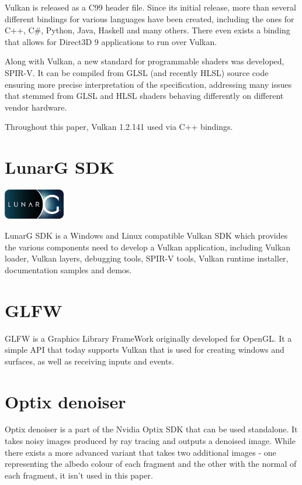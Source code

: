 \documentclass[times, utf8, zavrsni, numeric]{fer}
\begin{document}
Vulkan is released as a C99 header file. Since its initial release, more than several different bindings for various languages have been created, including the ones for C++, C\#, Python, Java, Haskell and many others. There even exists a binding that allows for Direct3D 9 applications to run over Vulkan.

Along with Vulkan, a new standard for programmable shaders was developed, SPIR-V. It can be compiled from GLSL (and recently HLSL) source code ensuring more precise interpretation of the specification, addressing many issues that stemmed from GLSL and HLSL shaders behaving differently on different vendor hardware.

Throughout this paper, Vulkan 1.2.141 used via C++ bindings.

\section{LunarG SDK}

\begin{center}
\includegraphics[width=0.2\textwidth]{lunarg_logo.png}
\end{center}

LunarG SDK is a Windows and Linux compatible Vulkan SDK which provides the various components need to develop a Vulkan application, including Vulkan loader, Vulkan layers, debugging tools, SPIR-V tools, Vulkan runtime installer, documentation samples and demos.

\section{GLFW}
GLFW is a Graphics Library FrameWork originally developed for OpenGL. It a simple API that today supports Vulkan that is used for creating windows and surfaces, as well as receiving inputs and events.

\section{Optix denoiser}
Optix denoiser \cite{nvidia_optix} is a part of the Nvidia Optix SDK that can be used standalone. It takes noisy images produced by ray tracing and outputs a denoised image. While there exists a more advanced variant that takes two additional images - one representing the albedo colour of each fragment and the other with the normal of each fragment, it isn't used in this paper.
\end{document}

